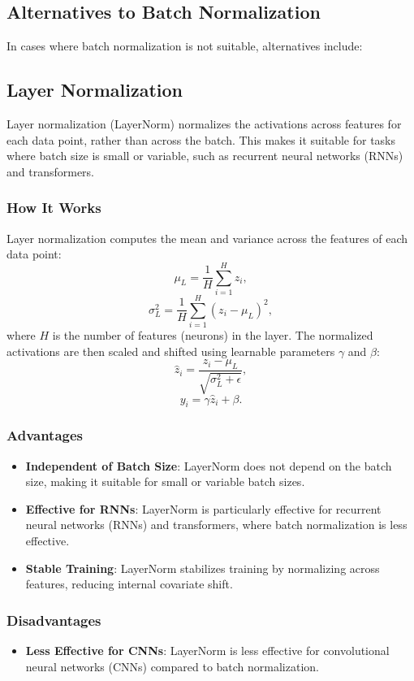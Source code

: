 \begin{notechapter}
\section{Alternatives to Batch Normalization}
In cases where batch normalization is not suitable, alternatives
include:

\subsection{Layer Normalization}
Layer normalization (LayerNorm) normalizes the activations across
features for each data point, rather than across the batch. This makes
it suitable for tasks where batch size is small or variable, such as
recurrent neural networks (RNNs) and transformers.

\subsubsection{How It Works}
Layer normalization computes the mean and variance across the features
of each data point:
\[
\mu_L = \frac{1}{H} \sum_{i=1}^H z_i,
\]
\[
\sigma_L^2 = \frac{1}{H} \sum_{i=1}^H (z_i - \mu_L)^2,
\]
where \(H\) is the number of features (neurons) in the layer. The
normalized activations are then scaled and shifted using learnable
parameters \(\gamma\) and \(\beta\):
\[
\hat{z}_i = \frac{z_i - \mu_L}{\sqrt{\sigma_L^2 + \epsilon}},
\]
\[
y_i = \gamma \hat{z}_i + \beta.
\]

\subsubsection{Advantages}
\begin{itemize}
    \item \textbf{Independent of Batch Size}:
    LayerNorm does not depend on the batch size, making it suitable for
    small or variable batch sizes.

    \item \textbf{Effective for RNNs}:
    LayerNorm is particularly effective for recurrent neural networks
    (RNNs) and transformers, where batch normalization is less effective.

    \item \textbf{Stable Training}:
    LayerNorm stabilizes training by normalizing across features, reducing
    internal covariate shift.
\end{itemize}

\subsubsection{Disadvantages}
\begin{itemize}
    \item \textbf{Less Effective for CNNs}:
    LayerNorm is less effective for convolutional neural networks (CNNs)
    compared to batch normalization.


\end{itemize}
\end{notechapter}
